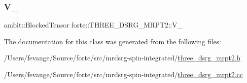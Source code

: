 \mbox{\label{classforte_1_1_t_h_r_e_e___d_s_r_g___m_r_p_t2_af1efc005853c4374d0e970dca72acec0}} 
\subsubsection{\texorpdfstring{V\+\_\+}{V\_}}
{\footnotesize\ttfamily ambit\+::\+Blocked\+Tensor forte\+::\+T\+H\+R\+E\+E\+\_\+\+D\+S\+R\+G\+\_\+\+M\+R\+P\+T2\+::\+V\+\_\+\hspace{0.3cm}{\ttfamily [protected]}}



The documentation for this class was generated from the following files\+:\begin{DoxyCompactItemize}
\item 
/\+Users/fevange/\+Source/forte/src/mrdsrg-\/spin-\/integrated/\mbox{\hyperlink{three__dsrg__mrpt2_8h}{three\+\_\+dsrg\+\_\+mrpt2.\+h}}\item 
/\+Users/fevange/\+Source/forte/src/mrdsrg-\/spin-\/integrated/\mbox{\hyperlink{three__dsrg__mrpt2_8cc}{three\+\_\+dsrg\+\_\+mrpt2.\+cc}}\end{DoxyCompactItemize}
